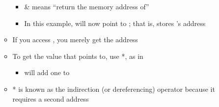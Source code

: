 \begin{itemize}
\begin{itemize}
\begin{itemize}
          \item \& means ``return the memory address of''

          \item In this example,  will now point to ; that is,  stores 's address

        \end{itemize}

      \item If you access , you merely get the address

      \item To get the value that  points to, use *, as in 

        \begin{itemize}

          \item {} will add one to 

        \end{itemize}

      \item * is known as the indirection (or dereferencing) operator because it requires a second address

    \end{itemize}

\end{itemize}



